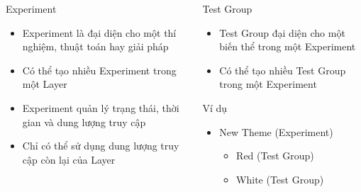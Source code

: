 \begin{frame}
	\begin{columns}
		\begin{column}{0.5\textwidth}
			\begin{block}{Experiment}
				\begin{itemize}
					\item Experiment là đại diện cho một thí nghiệm, thuật toán hay giải pháp
					\item Có thể tạo nhiều Experiment trong một Layer
					\item Experiment quản lý trạng thái, thời gian và dung lượng truy cập
					\item Chỉ có thể sử dụng dung lượng truy cập còn lại của Layer
				\end{itemize}
			\end{block}
		\end{column}
		\begin{column}{0.5\textwidth}
			\begin{block}{Test Group}
				\begin{itemize}
					\item Test Group đại diện cho một biến thể trong một Experiment
					\item Có thể tạo nhiều Test Group trong một Experiment
				\end{itemize}
			\end{block}
			\begin{block}{Ví dụ}
				\begin{itemize}
					\item New Theme (Experiment)
					      \begin{itemize}
						      \item Red (Test Group)
						      \item White (Test Group)
					      \end{itemize}
				\end{itemize}
			\end{block}
		\end{column}
	\end{columns}
\end{frame}

